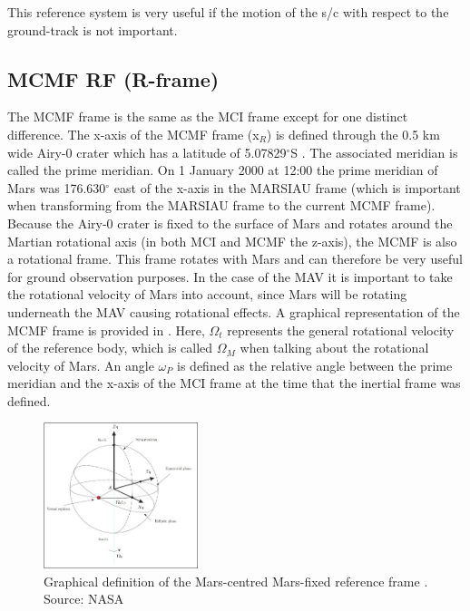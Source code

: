 
This reference system is very useful if the motion of the \ac{s/c} with respect to the ground-track is not important. 




\subsection{\acl{MCMF} \ac{RF} (R-frame)}
\label{subsec:ECEF}
The \acf{MCMF} frame is the same as the \ac{MCI} frame except for one distinct difference. The x-axis of the \ac{MCMF} frame (x$_{R}$) is defined through the 0.5 km wide Airy-0 crater \citep{morton2003mapping} which has a latitude of 5.07829$^{\circ}$S \citep{duxbury2014location}. The associated meridian is called the prime meridian. On 1 January 2000 at 12:00 the prime meridian of Mars was 176.630$^{\circ}$ east of the x-axis in the MARSIAU frame (which is important when transforming from the MARSIAU frame to the current \ac{MCMF} frame)\citep{diaz2008generic,archinal2011report}. Because the Airy-0 crater is fixed to the surface of Mars and rotates around the Martian rotational axis (in both \ac{MCI} and \ac{MCMF} the z-axis), the \ac{MCMF} is also a rotational frame. This frame rotates with Mars and can therefore be very useful for ground observation purposes. In the case of the \ac{MAV} it is important to take the rotational velocity of Mars into account, since Mars will be rotating underneath the \ac{MAV} causing rotational effects. A graphical representation of the \ac{MCMF} frame is provided in . Here, $\Omega_{t}$ represents the general rotational velocity of the reference body, which is called $\Omega_{M}$ when talking about the rotational velocity of Mars. An angle $\omega_{P}$ is defined as the relative angle between the prime meridian and the x-axis of the \ac{MCI} frame at the time that the inertial frame was defined.


\begin{figure}[!ht]
\centering
\includegraphics[width=0.4\textwidth]{figures/reference_frames/ecef_mooij2013fd.jpg}
\caption{Graphical definition of the Mars-centred Mars-fixed reference frame \citep{mooij2013fd}. Source: NASA}
\label{fig:ecef_mooij2013fd}
\end{figure}


